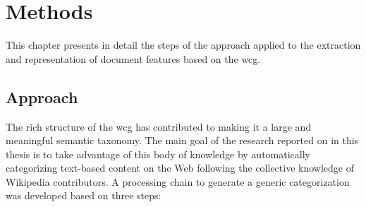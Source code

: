 \chapter{\hspace*{3pt} Methods}
\label{chapter:methodology}




This chapter presents in detail the steps of the approach applied to the extraction and representation of document features based on the \gls{wcg}.


\section{\hspace*{3pt} Approach} \label{sec:approach}
 
The rich structure of the \gls{wcg} has contributed to making it a large and meaningful semantic taxonomy. The main goal of the research reported on in this thesis is to take advantage of this body of knowledge by automatically categorizing text-based content on the Web following the collective knowledge of Wikipedia contributors. A processing chain to generate a generic categorization was developed based on three steps: 

